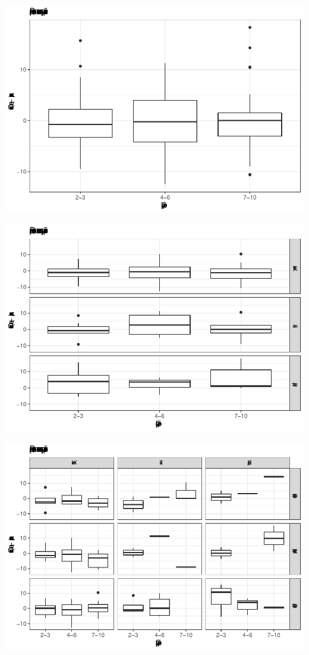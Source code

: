 \documentclass[
]{article}
\begin{document}
\begin{center}\includegraphics{Regression-model-for-estimating-RM_files/figure-latex/unnamed-chunk-33-1} \end{center}

\begin{center}\includegraphics{Regression-model-for-estimating-RM_files/figure-latex/unnamed-chunk-33-2} \end{center}

\begin{center}\includegraphics{Regression-model-for-estimating-RM_files/figure-latex/unnamed-chunk-33-3} \end{center}
\end{document}
